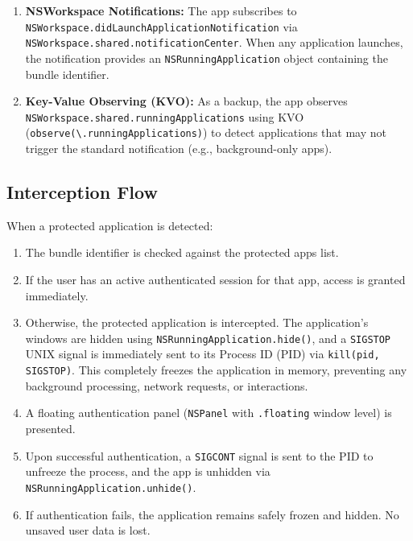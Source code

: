\documentclass[12pt,a4paper]{report}
\begin{document}
\begin{enumerate}
    \item \textbf{NSWorkspace Notifications:} The app subscribes to \texttt{NSWorkspace.didLaunchApplicationNotification} via \texttt{NSWorkspace.shared.notificationCenter}. When any application launches, the notification provides an \texttt{NSRunningApplication} object containing the bundle identifier.
    
    \item \textbf{Key-Value Observing (KVO):} As a backup, the app observes \texttt{NSWorkspace.shared.runningApplications} using KVO (\texttt{observe(\textbackslash.runningApplications)}) to detect applications that may not trigger the standard notification (e.g., background-only apps).
\end{enumerate}

\subsection{Interception Flow}
When a protected application is detected:

\begin{enumerate}[noitemsep]
    \item The bundle identifier is checked against the protected apps list.
    \item If the user has an active authenticated session for that app, access is granted immediately.
    \item Otherwise, the protected application is intercepted. The application's windows are hidden using \texttt{NSRunningApplication.hide()}, and a \texttt{SIGSTOP} UNIX signal is immediately sent to its Process ID (PID) via \texttt{kill(pid, SIGSTOP)}. This completely freezes the application in memory, preventing any background processing, network requests, or interactions.
    \item A floating authentication panel (\texttt{NSPanel} with \texttt{.floating} window level) is presented.
    \item Upon successful authentication, a \texttt{SIGCONT} signal is sent to the PID to unfreeze the process, and the app is unhidden via \texttt{NSRunningApplication.unhide()}.
    \item If authentication fails, the application remains safely frozen and hidden. No unsaved user data is lost.
\end{enumerate}
\end{document}
